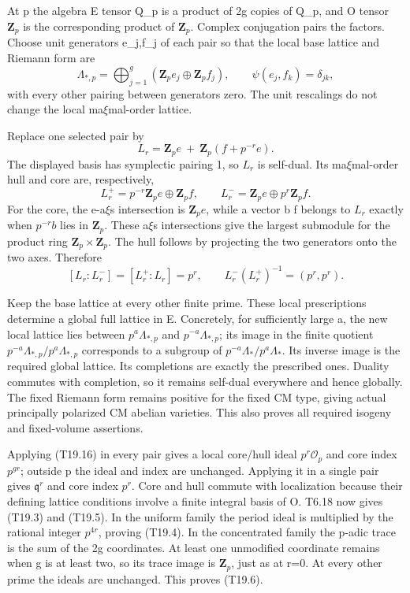 \documentclass[11pt,a4paper]{article}
\theoremstyle{definition}
\begin{document}
At p the algebra E tensor Q\_p is a product of 2g copies of Q\_p, and O tensor \(\mathbf Z_p\) is the corresponding product of \(\mathbf Z_p\). Complex conjugation pairs the factors. Choose unit generators e\_j,f\_j of each pair so that the local base lattice and Riemann form are \[
 \Lambda_{*,p}=\bigoplus_{j=1}^g(\mathbf Z_p e_j\oplus\mathbf Z_p f_j),
 \qquad \psi(e_j,f_k)=\delta_{jk},
\] with every other pairing between generators zero. The unit rescalings do not change the local ma\(\xi\)mal-order lattice.

Replace one selected pair by \[
 L_r=\mathbf Z_p e\ +\ \mathbf Z_p(f+p^{-r}e).
 \tag{T19.14}
\] The displayed basis has symplectic pairing 1, so \(L_r\) is self-dual. Its ma\(\xi\)mal-order hull and core are, respectively, \[
 L_r^+=p^{-r}\mathbf Z_p e\oplus\mathbf Z_p f,
 \qquad
 L_r^-=\mathbf Z_p e\oplus p^r\mathbf Z_p f.
 \tag{T19.15}
\] For the core, the e-a\(\xi\)s intersection is \(\mathbf Z_p e\), while a vector b f belongs to \(L_r\) exactly when \(p^{-r}b\) lies in \(\mathbf Z_p\). These a\(\xi\)s intersections give the largest submodule for the product ring \(\mathbf Z_p\times\mathbf Z_p\). The hull follows by projecting the two generators onto the two axes. Therefore \[
 [L_r:L_r^-]=[L_r^+:L_r]=p^r,
 \qquad L_r^-(L_r^+)^{-1}=(p^r,p^r).
 \tag{T19.16}
\]

Keep the base lattice at every other finite prime. These local prescriptions determine a global full lattice in E. Concretely, for sufficiently large a, the new local lattice lies between \(p^a\Lambda_{*,p}\) and \(p^{-a}\Lambda_{*,p}\); its image in the finite quotient \(p^{-a}\Lambda_{*,p}/p^a\Lambda_{*,p}\) corresponds to a subgroup of \(p^{-a}\Lambda_*/p^a\Lambda_*\). Its inverse image is the required global lattice. Its completions are exactly the prescribed ones. Duality commutes with completion, so it remains self-dual everywhere and hence globally. The fixed Riemann form remains positive for the fixed CM type, giving actual principally polarized CM abelian varieties. This also proves all required isogeny and fixed-volume assertions.

Applying (T19.16) in every pair gives a local core/hull ideal \(p^r\mathcal O_p\) and core index \(p^{gr}\); outside p the ideal and index are unchanged. Applying it in a single pair gives \(\mathfrak q^r\) and core index \(p^r\). Core and hull commute with localization because their defining lattice conditions involve a finite integral basis of O. T6.18 now gives (T19.3) and (T19.5). In the uniform family the period ideal is multiplied by the rational integer \(p^{4r}\), proving (T19.4). In the concentrated family the p-adic trace is the sum of the 2g coordinates. At least one unmodified coordinate remains when g is at least two, so its trace image is \(\mathbf Z_p\), just as at r=0. At every other prime the ideals are unchanged. This proves (T19.6).
\end{document}
